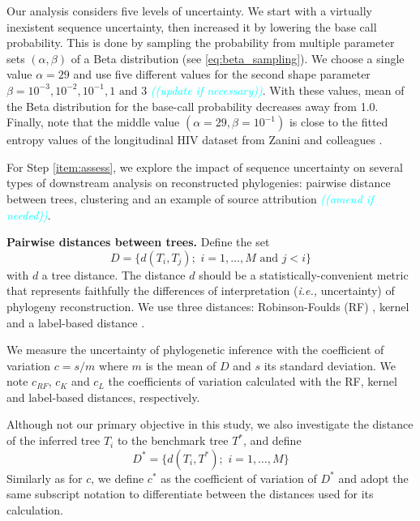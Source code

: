 \documentclass[10pt]{article}
\newcommand{\comment}[1]{\textsl{\textcolor{cyan}{((#1))}}}
\newcommand{\ie}{\textit{i.e.,}\xspace}
\begin{document}
Our analysis considers five levels of uncertainty. We start with a virtually inexistent sequence uncertainty, then increased it by lowering the base call probability. This is done by sampling the probability from multiple parameter sets $(\alpha,\beta)$ of a Beta distribution (see \autoref{eq:beta_sampling}). 
We choose a single value $\alpha=29$ and use five different values for the second shape parameter $\beta = 10^{-3}, 10^{-2}, 10^{-1}, 1 \text{ and } 3$ \comment{update if necessary}.
With these values, mean of the Beta distribution for the base-call probability decreases away from 1.0. 
Finally, note that the middle value $(\alpha=29, \beta=10^{-1})$ is close to the fitted entropy values of the longitudinal HIV dataset from Zanini and colleagues \cite{Zanini:2015}.

For Step \ref{item:assess}, we explore the impact of sequence uncertainty on several types of downstream analysis on reconstructed phylogenies: pairwise distance between trees, clustering and an example of source attribution \comment{amend if needed}.


\textbf{Pairwise distances between trees.}
Define the set 
\begin{equation}
D = \{d(T_i,T_j);\,\, i=1,\ldots, M \text{ and } j<i \}
\end{equation}
with $d$ a tree distance. 
The distance $d$ should be a statistically-convenient metric that represents faithfully the differences of interpretation (\ie uncertainty) of phylogeny reconstruction. 
We use three distances:  Robinson-Foulds (RF) \cite{Robinson:1981}, kernel \cite{Poon:2013} and a label-based distance \cite{xxx}. 

We measure the uncertainty of phylogenetic inference with the coefficient of variation $c = s / m$ where $m$ is the mean of $D$ and $s$ its standard deviation.
We note $c_{RF}$, $c_K$ and $c_{L}$ the coefficients of variation calculated with the RF, kernel and label-based distances, respectively.

Although not our primary objective in this study, we also investigate the distance of the inferred tree $T_i$ to the benchmark tree $T^*$, and define 
\begin{equation}
D^* = \{d(T_i,T^*);\,\, i=1,\ldots, M \} 
\end{equation}
Similarly as for $c$, we define $c^*$ as the coefficient of variation of $D^*$ and adopt the same subscript notation to differentiate between the distances used for its calculation.
\end{document}
